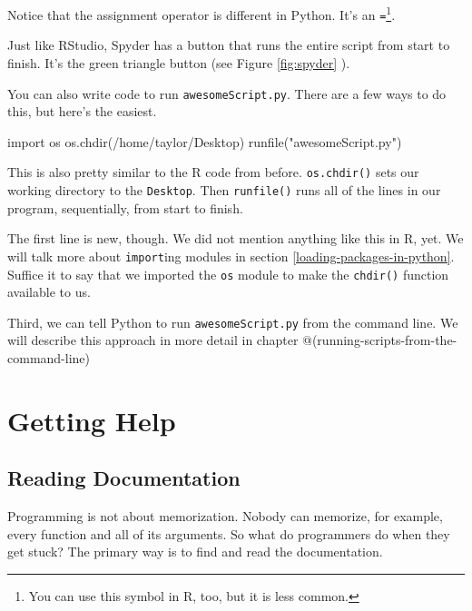 \documentclass[
  12pt,
  krantz2]{krantz}
\makeatletter
\newenvironment{Shaded}{\begin{snugshade}}{\end{snugshade}}
\newcommand{\ImportTok}[1]{#1}
\newcommand{\NormalTok}[1]{#1}
\newcommand{\StringTok}[1]{\textcolor[rgb]{0.5,0.5,0.5}{#1}}
\newenvironment{kframe}{%
\medskip{}
\setlength{\fboxsep}{.8em}
 \def\at@end@of@kframe{}%
 \ifinner\ifhmode%
  \def\at@end@of@kframe{\end{minipage}}%
  \begin{minipage}{\columnwidth}%
 \fi\fi%
 \def\FrameCommand##1{\hskip\@totalleftmargin \hskip-\fboxsep
 \colorbox{shadecolor}{##1}\hskip-\fboxsep
     \hskip-\linewidth \hskip-\@totalleftmargin \hskip\columnwidth}%
 \MakeFramed {\advance\hsize-\width
   \@totalleftmargin\z@ \linewidth\hsize
   \@setminipage}}%
 {\par\unskip\endMakeFramed%
 \at@end@of@kframe}
\renewenvironment{Shaded}{\begin{kframe}}{\end{kframe}}
\makeatother
\begin{document}
Notice that the assignment operator is different in Python. It's an \texttt{=}\footnote{You can use this symbol in R, too, but it is less common.}.

Just like RStudio, Spyder has a button that runs the entire script from start to finish. It's the green triangle button (see Figure \ref{fig:spyder} ).

You can also write code to run \texttt{awesomeScript.py}. There are a few ways to do this, but here's the easiest.

\begin{Shaded}
\begin{Highlighting}[]
\ImportTok{import}\NormalTok{ os}
\NormalTok{os.chdir(}\StringTok{\textquotesingle{}/home/taylor/Desktop\textquotesingle{}}\NormalTok{)}
\NormalTok{runfile(}\StringTok{"awesomeScript.py"}\NormalTok{)}
\end{Highlighting}
\end{Shaded}

This is also pretty similar to the R code from before. \texttt{os.chdir()} sets our working directory to the \texttt{Desktop}. Then \texttt{runfile()} runs all of the lines in our program, sequentially, from start to finish.

The first line is new, though. We did not mention anything like this in R, yet. We will talk more about \texttt{import}ing modules in section \ref{loading-packages-in-python}. Suffice it to say that we imported the \texttt{os} module to make the \texttt{chdir()} function available to us.

Third, we can tell Python to run \texttt{awesomeScript.py} from the command line. We will describe this approach in more detail in chapter @(running-scripts-from-the-command-line)

\hypertarget{getting-help}{%
\section{Getting Help}\label{getting-help}}

\hypertarget{reading-documentation}{%
\subsection{Reading Documentation}\label{reading-documentation}}

Programming is not about memorization. Nobody can memorize, for example, every function and all of its arguments. So what do programmers do when they get stuck? The primary way is to find and read the documentation.
\end{document}
